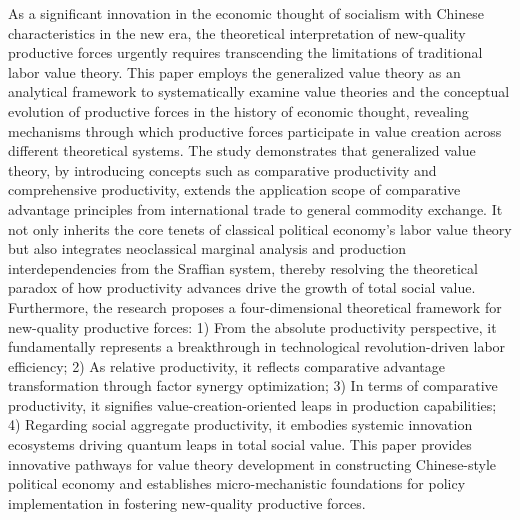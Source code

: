 \begin{abstract*}
  As a significant innovation in the economic thought of socialism with Chinese characteristics in the new era, the theoretical interpretation of new-quality productive forces urgently requires transcending the limitations of traditional labor value theory. This paper employs the generalized value theory as an analytical framework to systematically examine value theories and the conceptual evolution of productive forces in the history of economic thought, revealing mechanisms through which productive forces participate in value creation across different theoretical systems. The study demonstrates that generalized value theory, by introducing concepts such as comparative productivity and comprehensive productivity, extends the application scope of comparative advantage principles from international trade to general commodity exchange. It not only inherits the core tenets of classical political economy's labor value theory but also integrates neoclassical marginal analysis and production interdependencies from the Sraffian system, thereby resolving the theoretical paradox of how productivity advances drive the growth of total social value. Furthermore, the research proposes a four-dimensional theoretical framework for new-quality productive forces: 1) From the absolute productivity perspective, it fundamentally represents a breakthrough in technological revolution-driven labor efficiency; 2) As relative productivity, it reflects comparative advantage transformation through factor synergy optimization; 3) In terms of comparative productivity, it signifies value-creation-oriented leaps in production capabilities; 4) Regarding social aggregate productivity, it embodies systemic innovation ecosystems driving quantum leaps in total social value. This paper provides innovative pathways for value theory development in constructing Chinese-style political economy and establishes micro-mechanistic foundations for policy implementation in fostering new-quality productive forces.

\end{abstract*}
